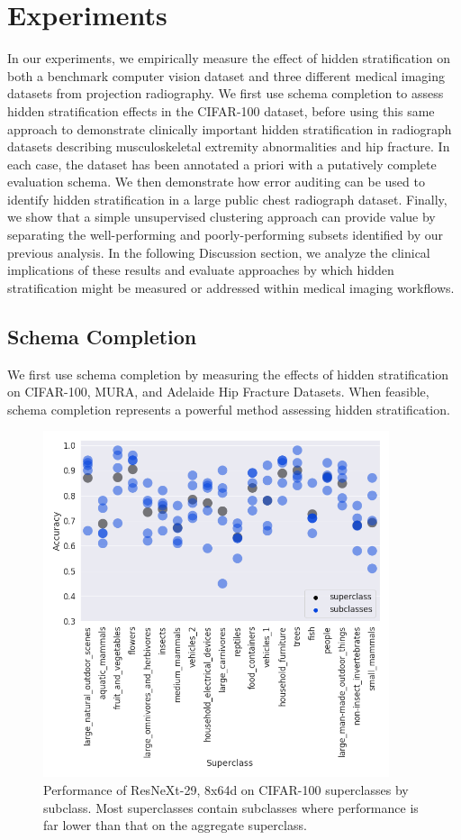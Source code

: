 \documentclass{article}
\begin{document}
\section{Experiments}

In our experiments, we empirically measure the effect of hidden stratification on both a benchmark computer vision dataset and three different medical imaging datasets from projection radiography.  
We first use schema completion to assess hidden stratification effects in the CIFAR-100 dataset, before using this same approach to demonstrate clinically important hidden stratification in radiograph datasets describing musculoskeletal extremity abnormalities and hip fracture.
In each case, the dataset has been annotated a priori with a putatively complete evaluation schema.
We then demonstrate how error auditing can be used to identify hidden stratification in a large public chest radiograph dataset.
Finally, we show that a simple unsupervised clustering approach can provide value by separating the well-performing and poorly-performing subsets identified by our previous analysis.
In the following Discussion section, we analyze the clinical implications of these results and evaluate approaches by which hidden stratification might be measured or addressed within medical imaging workflows.

\subsection{Schema Completion}

We first use schema completion by measuring the effects of hidden stratification on CIFAR-100, MURA, and Adelaide Hip Fracture Datasets.
When feasible, schema completion represents a powerful method assessing hidden stratification.


 \begin{figure}[htb!]
 \centering
\includegraphics[width=4in]{Superclass-Subclass-CIFAR-100-Correct-Val-v2.png}
\caption{Performance of ResNeXt-29, 8x64d on CIFAR-100 superclasses by subclass.  Most superclasses contain subclasses where performance is far lower than that on the aggregate superclass.}
\label{fig:cifar}
\end{figure}
\end{document}
